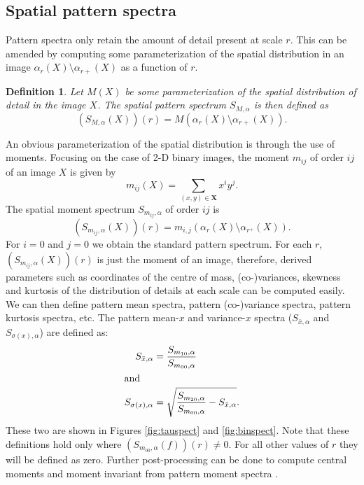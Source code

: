 \documentclass[b1]{sciposter}
\newtheorem{Def}{Definition}
\begin{document}
\begin{multicols}{2}
\section{Spatial pattern spectra}
Pattern spectra only retain the amount of detail present at  scale $r$.
This can be amended by computing some parameterization of the spatial 
distribution in an image $\alpha_r(X) \setminus \alpha_{r+}(X)$ as a function of $r$. 

\begin{Def}
Let ${M}(X)$ be some parameterization of the spatial distribution of detail
in the image $X$. The spatial pattern spectrum ${S}_{{M},\alpha}$ is
then defined as
\begin{equation}
  ({S}_{{M},\alpha}(X))(r) = {M}(\alpha_r(X) \setminus \alpha_{r+}(X)).
\end{equation}  
\end{Def}

An obvious parameterization of the spatial distribution is through 
the use of moments. Focusing on the case of 2-D binary images, the 
moment $m_{ij}$ of order $ij$ of an image $X$ is given by
\begin{equation}
  m_{ij}(X) = \sum_{(x,y) \in \mathbf X} x^i y^j.
\end{equation}  
The spatial moment spectrum $S_{m_{ij},\alpha}$ of order $ij$ is
\begin{equation}
  (S_{m_{ij},\alpha}(X))(r) = m_{i,j}(\alpha_r(X) \setminus \alpha_{r^+}(X)).
\end{equation}  
For $i=0$ and $j=0$ we obtain the standard pattern spectrum. 
For each $r$, $(S_{m_{ij},\alpha}(X))(r)$ is just the moment of an image, 
therefore, derived parameters such as coordinates of the centre of mass, 
(co-)variances, skewness and kurtosis of the distribution of details at each
scale can be computed easily. We can then define pattern mean
spectra, pattern (co-)variance spectra, pattern kurtosis spectra, etc. The 
pattern mean-$x$ and variance-$x$ spectra 
($S_{\bar x,\alpha}$ and $S_{\sigma(x),\alpha}$) are defined as: 
\begin{align}
  S_{\bar x,\alpha} & = \frac{S_{m_{10},\alpha}} {S_{m_{00},\alpha}} \\
\intertext{and}
   S_{\sigma(x),\alpha} & = \sqrt{\frac{S_{m_{20},\alpha}}
                                 {S_{m_{00},\alpha}} 
                                 - S_{\bar x, \alpha}}.  
 \end{align}
These two are shown in Figures \ref{fig:tauspect} and \ref{fig:binspect}. Note that 
these definitions hold only where $(S_{m_{00},\alpha}(f))(r) \neq 0$. For all 
other values of $r$ they will be defined as zero. Further post-processing can
be done to compute central moments and moment invariant from pattern moment 
spectra \cite{Flusser:Suk:93,Hu:62}. 


\end{multicols}
\end{document}

